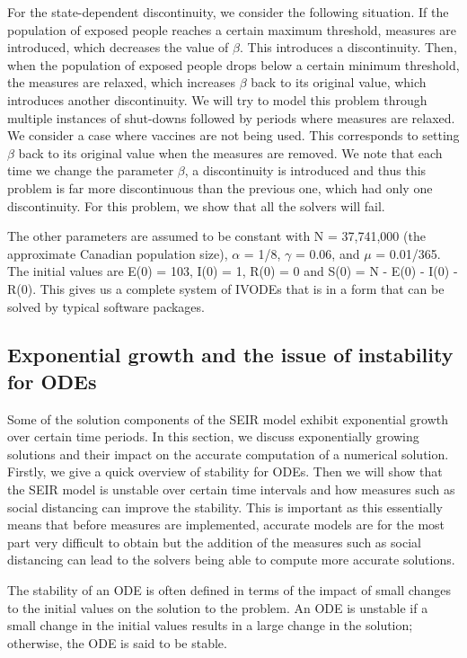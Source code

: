 For the state-dependent discontinuity, we consider the following situation. If the population of exposed people reaches a certain maximum threshold, measures are introduced, which decreases the value of $\beta$. This introduces a discontinuity. Then, when the population of exposed people drops below a certain minimum threshold, the measures are relaxed, which increases $\beta$ back to its original value, which introduces another discontinuity. We will try to model this problem through multiple instances of shut-downs followed by periods where measures are relaxed. We consider a case where vaccines are not being used. This corresponds to setting $\beta$ back to its original value when the measures are removed. We note that each time we change the parameter $\beta$, a discontinuity is introduced and thus this problem is far more discontinuous than the previous one, which had only one discontinuity. For this problem, we show that all the solvers will fail.

The other parameters are assumed to be constant with N = 37,741,000 (the approximate Canadian population size), $\alpha$ = 1/8, $\gamma$ = 0.06, and $\mu$ = 0.01/365. The initial values are E(0) = 103, I(0) = 1, R(0) = 0 and S(0) = N - E(0) - I(0) - R(0). This gives us a complete system of IVODEs that is in a form that can be solved by typical software packages.

\subsection{Exponential growth and the issue of instability for ODEs}
\label{subsection:exponential_growth}
Some of the solution components of the SEIR model exhibit exponential growth over certain time periods. In this section, we discuss exponentially growing solutions and their impact on the accurate computation of a numerical solution. Firstly, we give a quick overview of stability for ODEs. Then we will show that the SEIR model is unstable over certain time intervals and how measures such as social distancing can improve the stability. This is important as this essentially means that before measures are implemented, accurate models are for the most part very difficult to obtain but the addition of the measures such as social distancing can lead to the solvers being able to compute more accurate solutions.

The stability of an ODE is often defined in terms of the impact of small changes to the initial values on the solution to the problem. An ODE is unstable if a small change in the initial values results in a large change in the solution; otherwise, the ODE is said to be stable.

